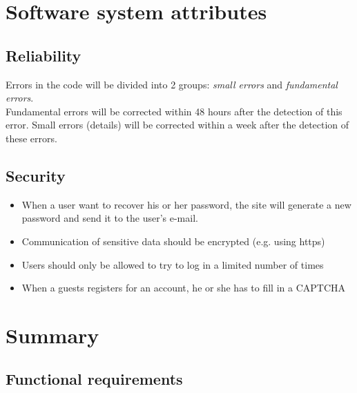 \section{Software system attributes}
	\subsection{Reliability}
		Errors in the code will be divided into 2 groups: \textit{small errors} and \textit{fundamental errors}. \\ 
		Fundamental errors will be corrected within 48 hours after the detection of this error. Small errors (details) will be corrected within a week after the detection of these errors. 
	\subsection{Security}
		\begin{itemize}
			\item When a user want to recover his or her password, the site will generate a new password and send it to the user's e-mail.
			\item Communication of sensitive data should be encrypted (e.g. using https)
			\item Users should only be allowed to try to log in a limited number of times
			\item When a guests registers for an account, he or she has to fill in a CAPTCHA
		\end{itemize}
\section{Summary}
	\subsection{Functional requirements}
